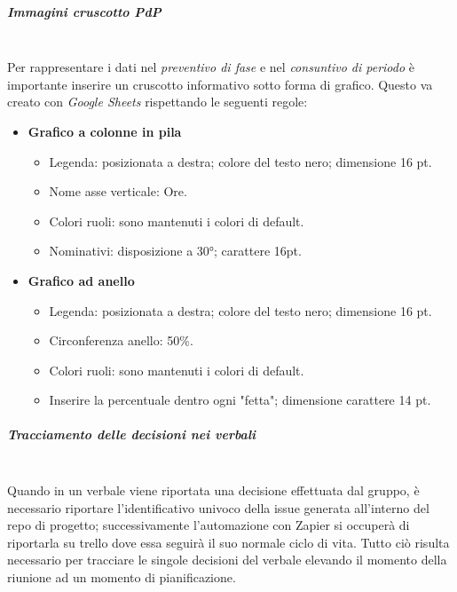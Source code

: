 \subparagraph{Immagini cruscotto PdP}
\mbox{}\\
Per rappresentare i dati nel \textit{preventivo di fase} e nel \textit{consuntivo di periodo}
è importante inserire un cruscotto informativo sotto forma di grafico. Questo va creato con
\textit{Google Sheets} rispettando le seguenti regole:
\begin{itemize}
    \item \textbf{Grafico a colonne in pila}
    \begin{itemize}
        \item Legenda: posizionata a destra; colore del testo nero; dimensione 16 pt.
        \item Nome asse verticale: Ore.
        \item Colori ruoli: sono mantenuti i colori di default.
        \item Nominativi: disposizione a 30°; carattere 16pt.
    \end{itemize}
    \item \textbf{Grafico ad anello}
    \begin{itemize}
        \item Legenda: posizionata a destra; colore del testo nero; dimensione 16 pt.
        \item Circonferenza anello: 50\%.
        \item Colori ruoli: sono mantenuti i colori di default.
        \item Inserire la percentuale dentro ogni "fetta"; dimensione carattere 14 pt.
    \end{itemize}
\end{itemize}

\subparagraph{Tracciamento delle decisioni nei verbali}
\mbox{}\\
Quando in un verbale viene riportata una decisione effettuata dal gruppo, è necessario
riportare l'identificativo univoco della issue generata all'interno del repo di progetto;
successivamente l'automazione con Zapier si occuperà di riportarla su trello dove essa
seguirà il suo normale ciclo di vita.
Tutto ciò risulta necessario per tracciare le singole decisioni del verbale elevando il
momento della riunione ad un momento di pianificazione.

